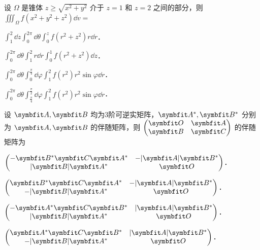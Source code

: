 \begin{question}[index=4]
设 $\Omega$ 是锥体 $z\geq\sqrt{x^2+y^2}$ 介于 $z=1$ 和 $z=2$ 之间的部分，则
$\displaystyle\iiint_{\Omega} f(x^2+y^2+z^2)\dd v=$
\begin{choices}[columns=2,label-pos=left]
\item $\displaystyle\int_1^2\dd z\int_0^{2\pi}\dd\theta\int_0^z f(r^2+z^2)r\dd r$．
\item $\displaystyle\int_0^{2\pi}\dd\theta\int_1^2 r\dd r\int_0^1 f(r^2+z^2)\dd z$．
\item $\displaystyle\int_0^{2\pi}\dd\theta\int_0^{\frac\pi4}\dd\varphi\int_1^2 f(r^2)r^2\sin\varphi\dd r$．
\item $\displaystyle\int_0^{2\pi}\dd\theta\int_{\frac\pi4}^{\frac\pi2}\dd\varphi\int_1^2 f(r^2)r^2\sin\varphi\dd r$．
\end{choices}
\end{question}
\QuestionBreak

\begin{question}[index=5]
设 $\symbfit A,\symbfit B$ 均为3阶可逆实矩阵，$\symbfit A^*,\symbfit B^*$ 分别为 $\symbfit A,\symbfit B$ 的伴随矩阵，则
$\begin{pmatrix}\symbfit O&\symbfit A\\\symbfit B&\symbfit C\end{pmatrix}$ 的伴随矩阵为
\begin{choices}[columns=2,label-pos=left]
\item $\begin{pmatrix}-\symbfit B^*\symbfit C\symbfit A^*&-|\symbfit A|\symbfit B^*\\|\symbfit B|\symbfit A^*&\symbfit O\end{pmatrix}$．
\item $\begin{pmatrix}\symbfit B^*\symbfit C\symbfit A^*&-|\symbfit A|\symbfit B^*\\-|\symbfit B|\symbfit A^*&\symbfit O\end{pmatrix}$．
\item $\begin{pmatrix}-\symbfit A^*\symbfit C\symbfit B^*&|\symbfit A|\symbfit B^*\\|\symbfit B|\symbfit A^*&\symbfit O\end{pmatrix}$．
\item $\begin{pmatrix}\symbfit A^*\symbfit C\symbfit B^*&|\symbfit A|\symbfit B^*\\-|\symbfit B|\symbfit A^*&\symbfit O\end{pmatrix}$．
\end{choices}
\end{question}
\QuestionBreak

